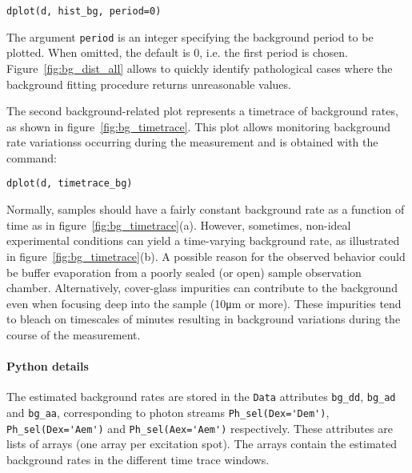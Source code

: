 \begin{lstlisting}
dplot(d, hist_bg, period=0)
\end{lstlisting}

The argument \verb|period| is an integer specifying the background period to be plotted.
When omitted, the default is 0, i.e. the first period is chosen.
Figure~\ref{fig:bg_dist_all} allows to quickly identify pathological cases where the 
background fitting procedure returns unreasonable values. 

The second background-related plot represents a timetrace of background rates, 
as shown in figure~\ref{fig:bg_timetrace}. This plot allows monitoring background rate variationss
occurring during the measurement and is obtained with the command:

\begin{lstlisting}
dplot(d, timetrace_bg)
\end{lstlisting}

Normally, samples should have a fairly constant background rate as a function of time
as in figure~\ref{fig:bg_timetrace}(a). However, sometimes, non-ideal
experimental conditions can yield a time-varying background rate, as illustrated in
figure~\ref{fig:bg_timetrace}(b).
A possible reason for the observed behavior could be buffer evaporation from a poorly sealed (or open) sample observation chamber. Alternatively,
cover-glass impurities can contribute to the background even when focusing 
deep into the sample (10μm or more).
These impurities tend to bleach on timescales of minutes resulting in
background variations during the course of the measurement.

\paragraph{Python details} 

The estimated background rates are stored in the \verb|Data| attributes
\verb|bg_dd|, \verb|bg_ad| and \verb|bg_aa|, corresponding to photon
streams \verb|Ph_sel(Dex='Dem')|, \verb|Ph_sel(Dex='Aem')| and \verb|Ph_sel(Aex='Aem')|
respectively.
These attributes are lists of arrays (one array per excitation spot).
The arrays contain the estimated background rates in the different time trace windows.
